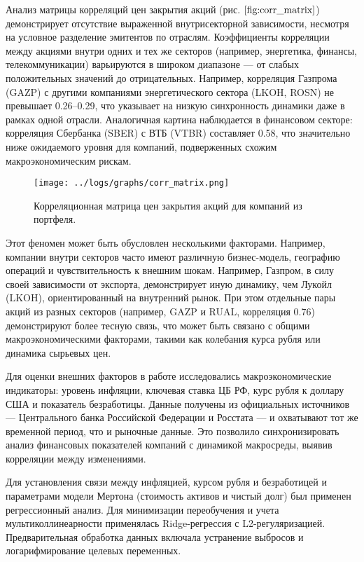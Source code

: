 \documentclass[]{article}
\begin{document}
	Анализ матрицы корреляций цен закрытия акций (рис. $\ref{fig:corr_matrix}$) демонстрирует отсутствие выраженной внутрисекторной зависимости, несмотря на условное разделение эмитентов по отраслям. Коэффициенты корреляции между акциями внутри одних и тех же секторов (например, энергетика, финансы, телекоммуникации) варьируются в широком диапазоне — от слабых положительных значений до отрицательных. Например, корреляция Газпрома (GAZP) с другими компаниями энергетического сектора (LKOH, ROSN) не превышает 0.26–0.29, что указывает на низкую синхронность динамики даже в рамках одной отрасли. Аналогичная картина наблюдается в финансовом секторе: корреляция Сбербанка (SBER) с ВТБ (VTBR) составляет 0.58, что значительно ниже ожидаемого уровня для компаний, подверженных схожим макроэкономическим рискам.
	
	\begin{figure}[ht] %
		\centering %
		\texttt{[image: ../logs/graphs/corr\_matrix.png]} %
		\caption{Корреляционная матрица цен закрытия акций для компаний из портфеля.} %
		\label{fig:corr_matrix} %
	\end{figure}
	
	
	Этот феномен может быть обусловлен несколькими факторами. Например, компании внутри секторов часто имеют различную бизнес-модель, географию операций и чувствительность к внешним шокам. Например, Газпром, в силу своей зависимости от экспорта, демонстрирует иную динамику, чем Лукойл (LKOH), ориентированный на внутренний рынок. При этом отдельные пары акций из разных секторов (например, GAZP и RUAL, корреляция 0.76) демонстрируют более тесную связь, что может быть связано с общими макроэкономическими факторами, такими как колебания курса рубля или динамика сырьевых цен.
	
	Для оценки внешних факторов в работе исследовались макроэкономические индикаторы: уровень инфляции, ключевая ставка ЦБ РФ, курс рубля к доллару США и показатель безработицы. Данные получены из официальных источников — Центрального банка Российской Федерации и Росстата — и охватывают тот же временной период, что и рыночные данные. Это позволило синхронизировать анализ финансовых показателей компаний с динамикой макросреды, выявив корреляции между изменениями.
	
	Для установления связи между инфляцией, курсом рубля и безработицей и параметрами модели Мертона (стоимость активов и чистый долг) был применен регрессионный анализ. Для минимизации переобучения и учета мультиколлинеарности применялась Ridge-регрессия с L2-регуляризацией. Предварительная обработка данных включала устранение выбросов и логарифмирование целевых переменных.
	
\end{document}
